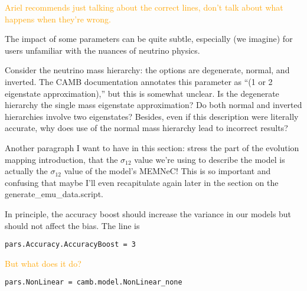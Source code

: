 \textcolor{orange}{Ariel recommends
just talking about the correct lines, don't talk about what happens when
they're wrong.}

The impact of some parameters can be quite subtle, especially (we imagine)
for users unfamiliar with the nuances of neutrino physics.

Consider the neutrino mass 
hierarchy: the options are degenerate, normal, and inverted. The CAMB 
documentation annotates this parameter as ``(1 or 2 eigenstate 
approximation),'' but this is somewhat unclear. Is the degenerate hierarchy 
the single mass eigenstate approximation? Do both normal and inverted 
hierarchies involve two eigenstates? Besides, even if this description were
literally accurate, why does use of the normal mass hierarchy lead to
incorrect results?



Another paragraph I want to have in this section: stress the part of the evolution mapping introduction, that the $\sigma_{12}$ value we're using to describe the model is actually the $\sigma_{12}$ value of the model's MEMNeC! This is so important and confusing that maybe I'll even recapitulate again later in the section on the generate\_emu\_data.script.


In principle, the accuracy boost should increase the variance in our models but should not affect the bias. The line is

\verb|pars.Accuracy.AccuracyBoost = 3|

\textcolor{orange}{But what does it do?}

\verb|pars.NonLinear = camb.model.NonLinear_none|


